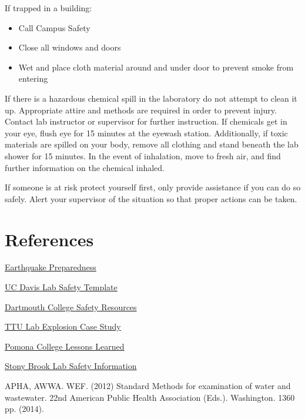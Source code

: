 \documentclass[12pt]{../SOP2}
\begin{document}
\NP If trapped in a building:
\begin{itemize}
  \item Call Campus Safety
  \item Close all windows and doors\
  \item Wet and place cloth material around and under door to prevent smoke from entering
\end{itemize}

\NP If there is a hazardous chemical spill in the laboratory do not attempt to clean it up.  Appropriate attire and methods are required in order to prevent injury.  Contact lab instructor or supervisor for further instruction. If chemicals get in your eye, flush eye for 15 minutes at the eyewash station.  Additionally, if toxic materials are spilled on your body, remove all clothing and stand beneath the lab shower for 15 minutes. In the event of inhalation, move to fresh air, and find further information on the chemical inhaled.  

\NP If someone is at risk protect yourself first, only provide assistance if you can do so safely.  Alert your supervisor of the situation so that proper actions can be taken.

\section{References}

\NP \href{http://emergency.cdc.gov/disasters/earthquakes/prepared.asp}{Earthquake Preparedness}

\NP \href{http://safetyservices.ucdavis.edu/sites/default/files/documents/LabSafetyPlan_Template.docx}{UC Davis Lab Safety Template}

\NP \href{https://www.dartmouth.edu/~chemlab/info/safety/hazards.html}{Dartmouth College Safety Resources}

\NP \href{http://www.csb.gov/file.aspx?DocumentId=420}{TTU Lab Explosion Case Study}

\NP \href{https://sakai.claremont.edu/access/content/group/CX_mtg_87013/Project%201%3A%20Lab%20and%20Field%20Safety/Lessons%20Learned/Lesson_Learned_Report.pdf}{Pomona College Lessons Learned}

\NP \href{https://ehs.stonybrook.edu/programs/laboratory-safety}{Stony Brook Lab Safety Information}

\NP APHA, AWWA. WEF. (2012) Standard Methods for examination of water and wastewater. 22nd American Public Health Association (Eds.). Washington. 1360 pp. (2014).
\end{document}
